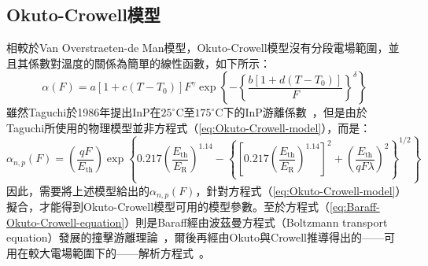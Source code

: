 \subsection{Okuto-Crowell模型}
相較於Van Overstraeten-de Man模型，Okuto-Crowell模型沒有分段電場範圍，並且其係數對溫度的關係為簡單的線性函數，如下所示：
\begin{equation}
\label{eq:Okuto-Crowell-model}
\alpha(F)=a\left[1+c\left(T-T_0\right)\right]F^\gamma\exp\left\{-\left\{\frac{b\left[1+d\left(T-T_0\right)\right]}{F}\right\}^\delta\right\}
\end{equation}
\hspace{2em}雖然Taguchi於1986年提出InP在$25^{\circ}\mathrm{C}$至$175^{\circ}\mathrm{C}$下的InP游離係數~\cite{taguchi1986temperature}，但是由於Taguchi所使用的物理模型並非方程式（\ref{eq:Okuto-Crowell-model}），而是：
\begin{equation}
\label{eq:Baraff-Okuto-Crowell-equation}
\alpha_{n,p}(F)=\left(\frac{qF}{E_\text{th}}\right)\exp\left\{0.217\left(\frac{E_\text{th}}{E_\text{R}}\right)^{1.14}-\left\{\left[0.217\left(\frac{E_\text{th}}{E_\text{R}}\right)^{1.14}\right]^2+\left(\frac{E_\text{th}}{qF\lambda}\right)^2\right\}^{1/2}\right\}
\end{equation}
因此，需要將上述模型給出的$\alpha_{n,p}(F)$，針對方程式（\ref{eq:Okuto-Crowell-model}）擬合，才能得到Okuto-Crowell模型可用的模型參數。至於方程式（\ref{eq:Baraff-Okuto-Crowell-equation}）則是Baraff經由波茲曼方程式（Boltzmann transport equation）發展的撞擊游離理論~\cite{baraff1962distribution}，爾後再經由Okuto與Crowell推導得出的——可用在較大電場範圍下的——解析方程式~\cite{okuto1972energy}。

